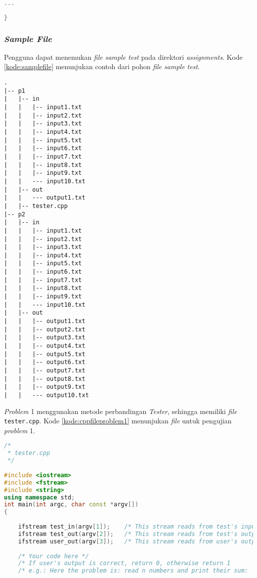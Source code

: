 \begin{enumerate}
\begin{lstlisting}[language=C++,caption=Templat kode \texttt{tester.cpp}, label=kode:cpptemplate]
	...
 
}
\end{lstlisting}

\subsubsection{\textit{Sample File}}
Pengguna dapat menemukan \textit{file sample test} pada direktori \textit{assignments}. Kode \ref{kode:samplefile} menunjukan contoh dari pohon \textit{file sample test}.

\begin{lstlisting}[caption=Contoh pohon \textit{file} dari \textit{sample test}, label=kode:samplefile]
.
|-- p1
|   |-- in
|   |   |-- input1.txt
|   |   |-- input2.txt
|   |   |-- input3.txt
|   |   |-- input4.txt
|   |   |-- input5.txt
|   |   |-- input6.txt
|   |   |-- input7.txt
|   |   |-- input8.txt
|   |   |-- input9.txt
|   |   --- input10.txt
|   |-- out
|   |   --- output1.txt
|   |-- tester.cpp
|-- p2
|   |-- in
|   |   |-- input1.txt
|   |   |-- input2.txt
|   |   |-- input3.txt
|   |   |-- input4.txt
|   |   |-- input5.txt
|   |   |-- input6.txt
|   |   |-- input7.txt
|   |   |-- input8.txt
|   |   |-- input9.txt
|   |   --- input10.txt
|   |-- out
|   |   |-- output1.txt
|   |   |-- output2.txt
|   |   |-- output3.txt
|   |   |-- output4.txt
|   |   |-- output5.txt
|   |   |-- output6.txt
|   |   |-- output7.txt
|   |   |-- output8.txt
|   |   |-- output9.txt
|   |   --- output10.txt
\end{lstlisting}

\textit{Problem} 1 menggunakan metode perbandingan \textit{Tester}, sehingga memiliki \textit{file} \texttt{tester.cpp}. Kode \ref{kode:cppfileproblem1} menunjukan \textit{file} untuk pengujian \textit{problem} 1.

\begin{lstlisting}[language=C++,caption=Kode metode perbandingan \textit{tester} dengan bahasa \textit{tester.cpp}, label=kode:cppfileproblem1]
/*
 * tester.cpp
 */
 
#include <iostream>
#include <fstream>
#include <string>
using namespace std;
int main(int argc, char const *argv[])
{
 
	ifstream test_in(argv[1]);    /* This stream reads from test's input file   */
	ifstream test_out(argv[2]);   /* This stream reads from test's output file  */
	ifstream user_out(argv[3]);   /* This stream reads from user's output file  */
 
	/* Your code here */
	/* If user's output is correct, return 0, otherwise return 1       */
	/* e.g.: Here the problem is: read n numbers and print their sum:  */
 

\end{lstlisting}
\end{enumerate}
